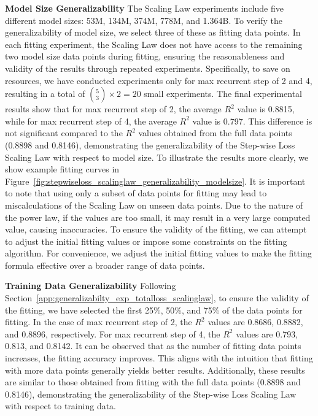 \documentclass[]{bytedance_seed}
\newcommand{\1}{\mathbf{1}}
\begin{document}
\textbf{Model Size Generalizability} 
The Scaling Law experiments include five different model sizes: 53M, 134M, 374M, 778M, and 1.364B. To verify the generalizability of model size, we select three of these as fitting data points. In each fitting experiment, the Scaling Law does not have access to the remaining two model size data points during fitting, ensuring the reasonableness and validity of the results through repeated experiments. 
Specifically, to save on resources, we have conducted experiments only for max recurrent step of 2 and 4, resulting in a total of $\binom{5}{3} \times 2 = 20$ small experiments.
The final experimental results show that for max recurrent step of 2, the average $R^2$ value is 0.8815, while for max recurrent step of 4, the average $R^2$ value is 0.797.
This difference is not significant compared to the $R^2$ values obtained from the full data points (0.8898 and 0.8146), demonstrating the generalizability of the Step-wise Loss Scaling Law with respect to model size. To illustrate the results more clearly, we show example fitting curves in Figure~\ref{fig:stepwiseloss_scalinglaw_generalizability_modelsize}. It is important to note that using only a subset of data points for fitting may lead to miscalculations of the Scaling Law on unseen data points. Due to the nature of the power law, if the values are too small, it may result in a very large computed value, causing inaccuracies. To ensure the validity of the fitting, we can attempt to adjust the initial fitting values or impose some constraints on the fitting algorithm. For convenience, we adjust the initial fitting values to make the fitting formula effective over a broader range of data points.

\textbf{Training Data Generalizability} 
Following Section~\ref{app:generalizabilty_exp_totalloss_scalinglaw}, to ensure the validity of the fitting, we have selected the first 25\%, 50\%, and 75\% of the data points for fitting. In the case of max recurrent step of 2, the $R^2$ values are 0.8686, 0.8882, and 0.8896, respectively. For max recurrent step of 4, the $R^2$ values are 0.793, 0.813, and 0.8142. 
It can be observed that as the number of fitting data points increases, the fitting accuracy improves. This aligns with the intuition that fitting with more data points generally yields better results. 
Additionally, these results are similar to those obtained from fitting with the full data points (0.8898 and 0.8146), demonstrating the generalizability of the Step-wise Loss Scaling Law with respect to training data.
\end{document}
